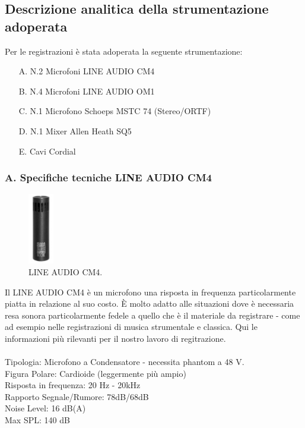 \documentclass{article}
\begin{document}
\subsection{Descrizione analitica della strumentazione adoperata}

Per le registrazioni è stata adoperata la seguente strumentazione:
\begin{itemize}
    \item[A.] N.2 Microfoni LINE AUDIO CM4
    \item[B.] N.4 Microfoni LINE AUDIO OM1
    \item[C.] N.1 Microfono Schoeps MSTC 74 (Stereo/ORTF)
    \item[D.] N.1 Mixer Allen Heath SQ5
    \item[E.] Cavi Cordial
\end{itemize}


\subsubsection{A. Specifiche tecniche LINE AUDIO CM4}
    \begin{figure}[H]
        \centering
        \includegraphics[width=0.1\textwidth]{images/CM4.jpg}
        \caption{\label{fig2}LINE AUDIO CM4.}
    \end{figure}
    
    Il LINE AUDIO CM4 è un microfono una risposta in frequenza particolarmente piatta in relazione al suo costo. È molto adatto alle situazioni dove è necessaria resa sonora particolarmente fedele a quello che è il materiale da registrare - come ad esempio nelle registrazioni di musica strumentale e classica. Qui le informazioni più rilevanti per il nostro lavoro di regitrazione.\\\\
    Tipologia: Microfono a Condensatore - necessita phantom a 48 V. \\
    Figura Polare: Cardioide (leggermente più ampio)\\
    Risposta in frequenza: 20 Hz - 20kHz\\
    Rapporto Segnale/Rumore: 78dB/68dB\\
    Noise Level: 16 dB(A)\\
    Max SPL: 140 dB
    
\end{document}
